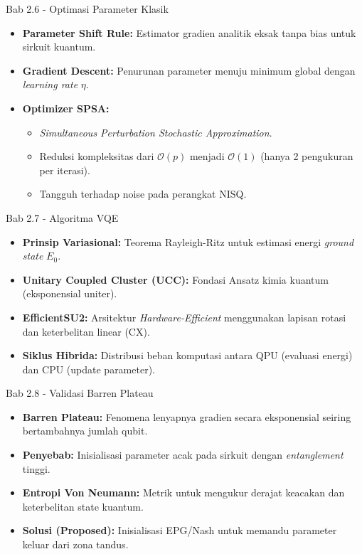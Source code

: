 \documentclass[aspectratio=169]{beamer}
\begin{document}
\begin{frame}{Bab 2.6 - Optimasi Parameter Klasik}
    \begin{itemize}
        \item \textbf{Parameter Shift Rule:} Estimator gradien analitik eksak tanpa bias untuk sirkuit kuantum.
        \item \textbf{Gradient Descent:} Penurunan parameter menuju minimum global dengan \textit{learning rate} $\eta$.
        \item \textbf{Optimizer SPSA:}
        \begin{itemize}
            \item \textit{Simultaneous Perturbation Stochastic Approximation}.
            \item Reduksi kompleksitas dari $\mathcal{O}(p)$ menjadi $\mathcal{O}(1)$ (hanya 2 pengukuran per iterasi).
            \item Tangguh terhadap noise pada perangkat NISQ.
        \end{itemize}
    \end{itemize}
\end{frame}

\begin{frame}{Bab 2.7 - Algoritma VQE}
    \begin{itemize}
        \item \textbf{Prinsip Variasional:} Teorema Rayleigh-Ritz untuk estimasi energi \textit{ground state} $E_0$.
        \item \textbf{Unitary Coupled Cluster (UCC):} Fondasi Ansatz kimia kuantum (eksponensial uniter).
        \item \textbf{EfficientSU2:} Arsitektur \textit{Hardware-Efficient} menggunakan lapisan rotasi dan  keterbelitan linear (CX).
        \item \textbf{Siklus Hibrida:} Distribusi beban komputasi antara QPU (evaluasi energi) dan  CPU (update parameter).
    \end{itemize}
\end{frame}

\begin{frame}{Bab 2.8 - Validasi Barren Plateau}
    \begin{itemize}
        \item \textbf{Barren Plateau:} Fenomena lenyapnya gradien secara eksponensial seiring bertambahnya jumlah qubit.
        \item \textbf{Penyebab:} Inisialisasi parameter acak pada sirkuit dengan \textit{entanglement} tinggi.
        \item \textbf{Entropi Von Neumann:} Metrik untuk mengukur derajat keacakan dan  keterbelitan state kuantum.
        \item \textbf{Solusi (Proposed):} Inisialisasi EPG/Nash untuk memandu parameter keluar dari zona tandus.
    \end{itemize}
\end{frame}
\end{document}
